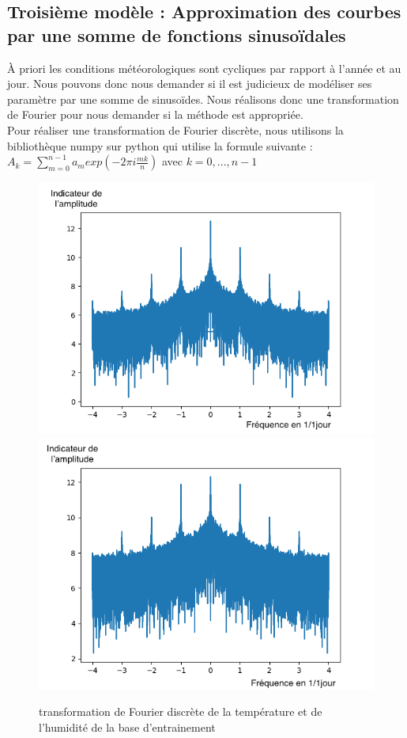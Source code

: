 \documentclass[11pt,a4paper]{article}
\begin{document}
\subsection{Troisième modèle : Approximation des courbes par une somme de fonctions sinusoïdales}
À priori les conditions météorologiques sont cycliques par rapport à l'année et au jour. Nous pouvons donc nous demander si il est judicieux de modéliser ses paramètre par une somme de sinusoïdes. Nous réalisons donc une
transformation de Fourier pour nous demander si la méthode est appropriée. \\
Pour réaliser une transformation de Fourier discrète, nous utilisons la bibliothèque numpy sur python qui utilise la formule suivante :  \\
$ A_{k}  = \displaystyle { \sum_{m=0}^{n-1}} a_{m} exp(-2\pi i \frac{mk}{n} ) $ avec $k = 0, ... , n-1 $   \\ 
\vspace {0.3cm}
\begin{figure} [!h]
\centering
\includegraphics[width=0.48 \textwidth]{./imagesTIPE/fftT.png}\quad
\includegraphics[width=0.48 \textwidth]{./imagesTIPE/fftH.png}
\caption{\label{fig:190101Lolita} transformation de Fourier discrète de la température et de l'humidité de la base d'entrainement}
\end{figure}
\end{document}
